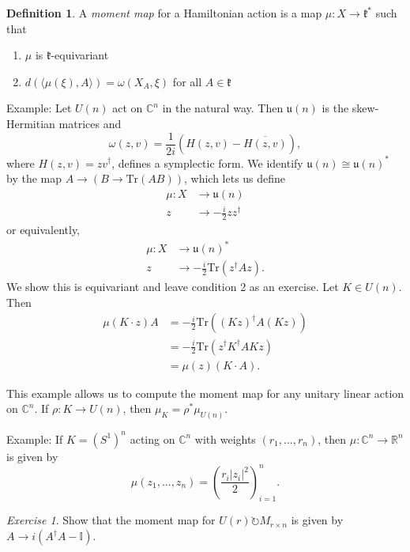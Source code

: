 \documentclass{article}
\theoremstyle{definition}
\newtheorem{definition}[theorem]{Definition}
\theoremstyle{remark}
\newtheorem{exercise}[theorem]{Exercise}
\numberwithin{theorem}{section}
\newcommand{\C}{\mathbb{C}}
\newcommand{\fk}{\mathfrak{k}}
\newenvironment{defn}{
	\begin{mdframed}
		\vspace{-0.5em}
		\begin{definition}
		}{
		\end{definition}
	\end{mdframed}
}
\begin{document}
		\begin{defn}
			A \emph{moment map} for a Hamiltonian action is a map $\mu:X\to\fk^\ast$ such that
			\begin{enumerate}
				\item $\mu$ is $\fk$-equivariant
				\item $d(\langle \mu(\xi), A\rangle) = \omega(X_A, \xi)$ for all $A\in\fk$
			\end{enumerate}
		\end{defn}
		\noindent Example: Let $U(n)$ act on $\C^n$ in the natural way. Then $\mathfrak{u}(n)$ is the skew-Hermitian matrices and 
		\begin{equation}
			\omega(z,v) = \frac{1}{2i}\left(H(z,v)-\overline{H(z,v)}\right),
		\end{equation}
		where $H(z,v)=zv^\dagger$, defines a symplectic form. We identify $\mathfrak{u}(n)\cong\mathfrak{u}(n)^\ast$ by the map $A\to \left(B\to \text{Tr}(AB)\right)$, which lets us define
		\begin{align*}
			\mu:X&\to \mathfrak{u}(n)\\
			z&\to -\frac{i}{2}zz^\dagger
		\end{align*} 
		or equivalently,
		\begin{align*}
			\mu:X&\to \mathfrak{u}(n)^\ast\\
			z&\to -\frac{i}{2}\text{Tr}(z^\dagger A z).
		\end{align*} 
		We show this is equivariant and leave condition 2 as an exercise. Let $K\in U(n)$. Then
		\begin{align*}
			\mu(K\cdot z)A &= -\frac{i}{2}\text{Tr}\left( (Kz)^\dagger A (Kz)\right)\\
			&= -\frac{i}{2}\text{Tr}(z^\dagger K^\dagger A K z)\\
			&= \mu(z)(K\cdot A).
		\end{align*}
		
		This example allows us to compute the moment map for any unitary linear action on $\C^n$. If $\rho:K\to U(n)$, then $\mu_K = \rho^\ast \mu_{U(n)}$.
		
		\noindent Example: If $K=(S^1)^n$ acting on $\C^n$ with weights $(r_1,...,r_n)$, then $\mu:\C^n\to\mathbb{R}^n$ is given by
		$$ \mu(z_1,...,z_n) = \left(\frac{r_i|z_i|^2}{2}\right)_{i=1}^n.$$
		
		\begin{exercise}
			Show that the moment map for $U(r)\circlearrowright M_{r\times n}$ is given by $A\to i(A^\dagger A - \mathbb{I})$.
		\end{exercise}
		
\end{document}
